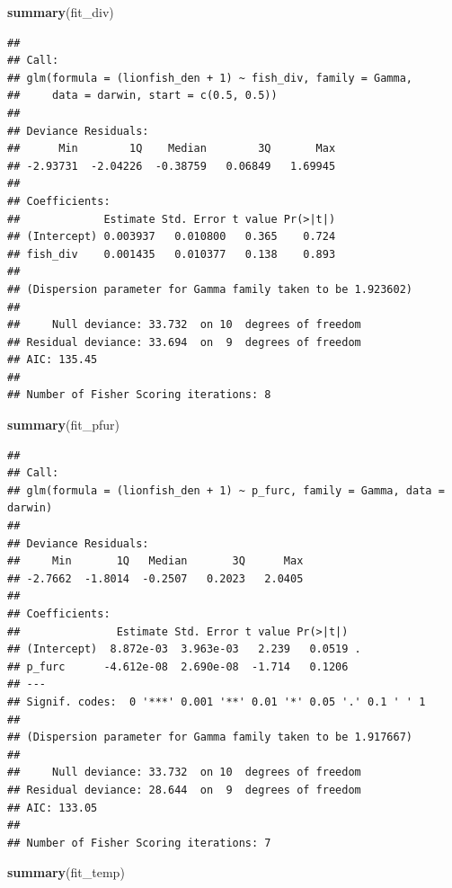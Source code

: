 \documentclass[]{article}
\newenvironment{Shaded}{\begin{snugshade}}{\end{snugshade}}
\newcommand{\KeywordTok}[1]{\textcolor[rgb]{0.13,0.29,0.53}{\textbf{#1}}}
\newcommand{\NormalTok}[1]{#1}
\begin{document}
\begin{Shaded}
\begin{Highlighting}[]
\KeywordTok{summary}\NormalTok{(fit_div)}
\end{Highlighting}
\end{Shaded}

\begin{verbatim}
## 
## Call:
## glm(formula = (lionfish_den + 1) ~ fish_div, family = Gamma, 
##     data = darwin, start = c(0.5, 0.5))
## 
## Deviance Residuals: 
##      Min        1Q    Median        3Q       Max  
## -2.93731  -2.04226  -0.38759   0.06849   1.69945  
## 
## Coefficients:
##             Estimate Std. Error t value Pr(>|t|)
## (Intercept) 0.003937   0.010800   0.365    0.724
## fish_div    0.001435   0.010377   0.138    0.893
## 
## (Dispersion parameter for Gamma family taken to be 1.923602)
## 
##     Null deviance: 33.732  on 10  degrees of freedom
## Residual deviance: 33.694  on  9  degrees of freedom
## AIC: 135.45
## 
## Number of Fisher Scoring iterations: 8
\end{verbatim}

\begin{Shaded}
\begin{Highlighting}[]
\KeywordTok{summary}\NormalTok{(fit_pfur)}
\end{Highlighting}
\end{Shaded}

\begin{verbatim}
## 
## Call:
## glm(formula = (lionfish_den + 1) ~ p_furc, family = Gamma, data = darwin)
## 
## Deviance Residuals: 
##     Min       1Q   Median       3Q      Max  
## -2.7662  -1.8014  -0.2507   0.2023   2.0405  
## 
## Coefficients:
##               Estimate Std. Error t value Pr(>|t|)  
## (Intercept)  8.872e-03  3.963e-03   2.239   0.0519 .
## p_furc      -4.612e-08  2.690e-08  -1.714   0.1206  
## ---
## Signif. codes:  0 '***' 0.001 '**' 0.01 '*' 0.05 '.' 0.1 ' ' 1
## 
## (Dispersion parameter for Gamma family taken to be 1.917667)
## 
##     Null deviance: 33.732  on 10  degrees of freedom
## Residual deviance: 28.644  on  9  degrees of freedom
## AIC: 133.05
## 
## Number of Fisher Scoring iterations: 7
\end{verbatim}

\begin{Shaded}
\begin{Highlighting}[]
\KeywordTok{summary}\NormalTok{(fit_temp)}
\end{Highlighting}
\end{Shaded}
\end{document}
